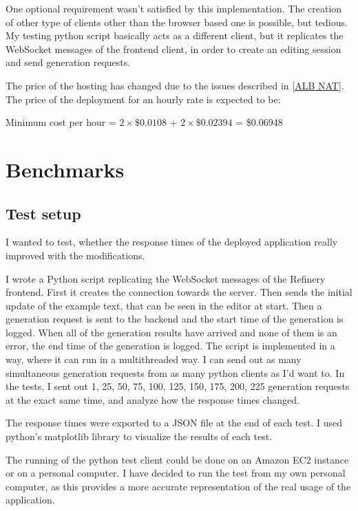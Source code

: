 	One optional requirement wasn't satisfied by this implementation. The creation of other type of clients other than the browser
	based one is possible, but tedious. My testing python script basically acts as a different client, but it replicates the WebSocket
	messages of the frontend client, in order to create an editing session and send generation requests.

	The price of the hosting has changed due to the issues described in \ref{ALB NAT}. The price of the deployment for an hourly rate 
	is expected to be:

	\begin{center}
		Minimum cost per hour = $2 \times \$0.0108$ + $2 \times \$0.02394$ = \$0.06948
	\end{center}

	\section{Benchmarks} \label{Benchmarks}
		\subsection{Test setup}
		I wanted to test, whether the response times of the deployed application really improved with the modifications.

		I wrote a Python script replicating the WebSocket messages of the Refinery frontend. First it creates the connection
		towards the server. Then sends the initial update
		of the example text, that can be seen in the editor at start. Then a generation request is sent to the backend and the start time of the generation
		is logged. When all of the generation results have arrived and none of them is an error, the end time of the generation is logged. 
		The script is implemented in a way, where it can run in a multithreaded way. I can send out as many simultaneous generation requests 
		from as many python clients as I'd want to. In the tests, I sent out 1, 25, 50, 75, 100, 125, 150, 175, 200, 225 generation requests
		at the exact same time, and analyze how the response times changed.

		The response times were exported to a JSON file at the end of each test. I used python's matplotlib library to visualize the results
		of each test.

		The running of the python test client could be done on an Amazon EC2 instance or on a personal computer. I have decided to run the test 
		from my own personal computer, as this provides a more accurate representation of the real usage of the application.

